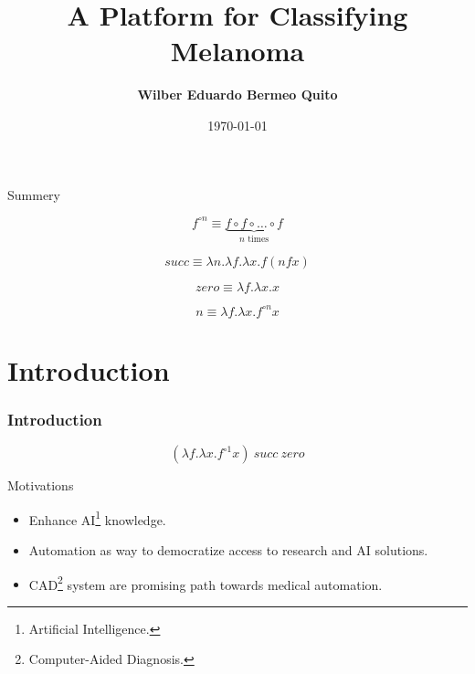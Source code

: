 \documentclass[dvipsnames,mathserif]{beamer}
\begin{document}
  \rightskip\rightmargin
  \title{A Platform for Classifying Melanoma}
  \author{ \Large \textbf{Wilber Eduardo Bermeo Quito} }
  \footnotesize{\date{\today }


    \begin{frame}
      \maketitle
    \end{frame}

    \begin{frame}{Summery}
      \footnotesize \tableofcontents

    \end{frame}

    \begin{frame}

      \[f^{\circ n} \equiv \underbrace{f \circ f \circ \ldots \circ f}_{n \text{ times}} \]

      \[succ \equiv \lambda n. \lambda f. \lambda x. f (n f x) \]

      \[zero \equiv \lambda f. \lambda x. x\]

      \[n \equiv \lambda f. \lambda x. f^{\circ n} x\]

    \end{frame}

    \section{Introduction}


    \begin{frame}
      \frametitle{Introduction}

      \[(\lambda f. \lambda x. f^{\circ 1} x)\ succ\ zero\]

    \end{frame}


    \begin{frame}
      \large Motivations
      \vspace{0.25cm}

      \footnotesize
      \begin{itemize}
        \item Enhance AI\footnote{Artificial Intelligence.} knowledge.
        \item Automation as way to democratize access to research and AI solutions.
        \item CAD\footnote{Computer-Aided Diagnosis.} system are promising path
          towards medical automation.
      \end{itemize}
    \end{frame}


}
\end{document}
